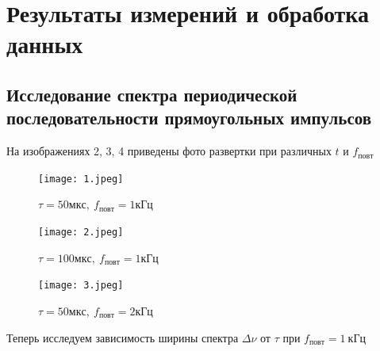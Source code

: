 \documentclass[12pt,a4paper]{article}
\begin{document}



\section{Результаты измерений и обработка данных}
\subsection{Исследование спектра периодической последовательности прямоугольных импульсов}

На изображениях 2, 3, 4 приведены фото развертки при различных $t$ и $f_{повт}$ 

\begin{figure}[h!]
    \centering
    \texttt{[image: 1.jpeg]}
    \caption[]{$\tau = 50мкс,\ f_{повт} = 1кГц$}
\end{figure}
\begin{figure}[h!]
    \centering
    \texttt{[image: 2.jpeg]}
    \caption[]{$\tau = 100мкс,\ f_{повт} = 1кГц$}
\end{figure}
\begin{figure}[h!]
    \centering
    \texttt{[image: 3.jpeg]}
    \caption[]{$\tau = 50мкс,\ f_{повт} = 2кГц$}
\end{figure}
\newpage
Теперь исследуем зависимость ширины спектра $\Delta\nu$ от $\tau$ при $f_{повт} = 1\ кГц$
\end{document}
